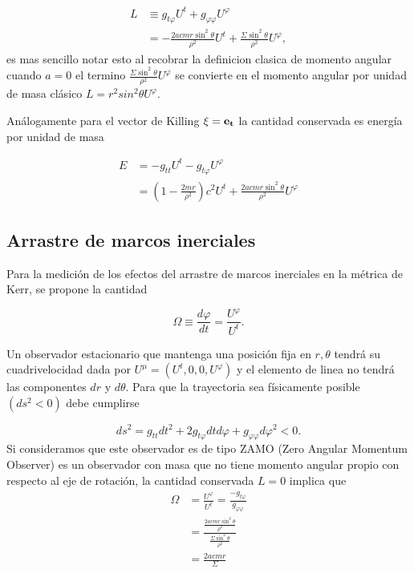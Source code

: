 \begin{equation}
    \begin{aligned}
L &\equiv  g_{ t \varphi}  U^t + g_{\varphi\varphi}  U^\varphi \\ 
  & =- \frac{2a c mr \sin^2\theta}{\rho^2}   U^t + \frac{\Sigma \sin^2\theta}{\rho^2}  U^\varphi,
    \end{aligned}
\end{equation}
es mas sencillo notar esto al recobrar la definicion clasica de momento angular cuando  $a=0$ el termino  $\frac{\Sigma \sin^2\theta}{\rho^2} U^\varphi$ se convierte en el momento angular por unidad de masa clásico $L= r^2 sin^2\theta U^\varphi$.

Análogamente para el vector de Killing $\mathbf{\xi} = \mathbf{e_t}$ la cantidad conservada es energía por unidad de masa

\begin{equation}
    \begin{aligned}
E &= -g_{ t t}  U^t - g_{t \varphi}  U^\varphi \\ 
  & =  \left(1-\frac{2 mr}{\rho^2}\right) c^2 U^t +    \frac{2a c mr \sin^2\theta}{\rho^2}    U^\varphi
    \end{aligned}
\end{equation}

\subsection{Arrastre de marcos inerciales}

Para la medición de los efectos del arrastre de marcos inerciales en la métrica de Kerr, se propone la cantidad

\begin{equation}
    \Omega \equiv \frac{d \varphi}{d t}=\frac{U^{\varphi}}{U^t}.
\end{equation}

Un observador estacionario que mantenga una posición fija en $r,\theta$ tendrá su cuadrivelocidad dada por  $U^\mu=\left(U^t, 0,0, U^{\varphi}\right)$ y el elemento de linea no tendrá las componentes $dr$ y $d\theta$.
Para que la trayectoria sea físicamente posible $\left(d s^2<0\right)$ debe cumplirse

\begin{equation}
    d s^2=g_{t t}dt^2+2 g_{t \varphi} dtd\varphi+g_{\varphi \varphi}d\varphi^2<0.
\end{equation}
Si consideramos que este observador es de tipo ZAMO  (Zero Angular Momentum Observer) es un observador con masa que no tiene momento angular propio con respecto al eje de rotación, la cantidad conservada $L=0$ implica que
\begin{equation}
    \begin{aligned}
        \Omega &=\frac{U^{\varphi}}{U^t} = \frac{ - g_{t \varphi}}{g_{\varphi \varphi}}\\ 
& = \frac{ \frac{2a c mr \sin^2\theta}{\rho^2}}{\frac{\Sigma \sin^2\theta}{\rho^2}}\\ 
& = \frac{2a c mr}{\Sigma}
    \end{aligned}
\end{equation}


